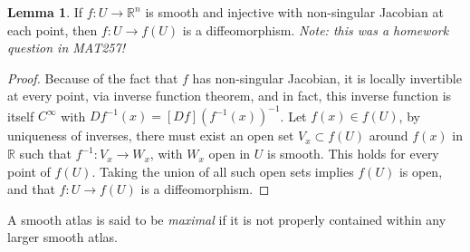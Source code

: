 \documentclass[aps,pra,showpacs,notitlepage,onecolumn,superscriptaddress,nofootinbib]{revtex4-1}
\theoremstyle{definition}
\newtheorem{lemma}{Lemma}[section]
\begin{document}
  \begin{lemma}
   If $f : U \rightarrow \mathbb{R}^{n}$ is smooth and injective with non-singular Jacobian at each point, then $f : U \rightarrow f(U)$ is a diffeomorphism. \emph{Note: this was a homework question in MAT257!}
  \end{lemma}
  \begin{proof}
    Because of the fact that $f$ has non-singular Jacobian, it is locally invertible at every point, via inverse function theorem, and in fact, this inverse function is itself $C^{\infty}$
    with $D f^{-1}(x) = [D f](f^{-1}(x))^{-1}$. Let $f(x) \in f(U)$, by uniqueness of inverses, there must exist an open set $V_x \subset f(U)$ around $f(x)$ in $\mathbb{R}$ such that $f^{-1} : V_x \rightarrow W_x$, with
    $W_x$ open in $U$ is smooth. This holds for every point of $f(U)$. Taking the union of all such open sets implies $f(U)$ is open, and that $f : U \rightarrow f(U)$ is a diffeomorphism.
  \end{proof}

  \noindent A smooth atlas is said to be \emph{maximal} if it is not properly contained within any larger smooth atlas.
\end{document}
